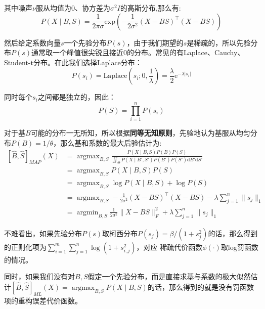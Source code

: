 其中噪声$\nu$服从均值为0、协方差为$\sigma^2I$的高斯分布,那么有:
\begin{equation}
  P(X\mid B,S)=\dfrac{1}{2\pi\sigma}\text{exp}
\left(-\frac{1}{2\sigma^2}(X-BS)^{\top}(X-BS)\right)
\end{equation}

然后给定系数向量$s$一个先验分布$P(s)$，由于我们期望的$s$是稀疏的，所以先验分布$P(s)$通常取一个峰值很尖锐且接近0的分布。常见的有Laplace、Cauchy、Student-t分布。在此我们选择Laplace分布：
\begin{equation}
P(s_i)=\text{Laplace}(s_i;0,\frac{1}{\lambda})=\frac{\lambda}{2}
\text{e}^{-\lambda|s_i|}
\end{equation}

同时每个$s_i$之间都是独立的，因此：
\begin{equation}
  P(S)=\prod_{i=1}^{n}P(s_i)
\end{equation}


对于基$B$可能的分布一无所知，所以根据\textbf{同等无知原则}，先验地认为基服从均匀分布$P(B)=1/\theta$，那么基和系数的最大后验估计为:
\begin{align*}\label{bayes}
  [\hat{B},\hat{S}]_{MAP}(X)
& =\mathop{\arg\max}_{B,S}\frac{P( X\mid B,S)P(B)P(S)}{\iint_{\Theta}P( X\mid B',S')P(B')P(S')\textrm{d}B'\textrm{d}S'}\\
& =\mathop{\arg\max}_{B,S}P(X\mid B,S)P(S)\\
& =\mathop{\arg\max}_{B,S}\log P(X\mid B,S)+\log P(S)\\
& =\mathop{\arg\max}_{B,S}
-\frac{1}{2\sigma^2}(X-BS)^{\top}(X-BS)
-\lambda\sum_{j=1}^{n}\|s_j\|_1\\
& =\mathop{\arg\min}_{B,S}\frac{1}{2\sigma^2}\|X-BS\|_F^2+
\lambda\sum_{j=1}^{n}\|s_j\|_1
\end{align*}

不难看出，如果先验分布$P(s)$取柯西分布$P(s_j) = \beta/(1+s_j^2) $的话，那么得到的正则化项为$ \sum_{i=1}^{m}\sum_{j=1}^{n}\log(1+s_{i,j}^2)$，对应
稀疏代价函数$\phi(\cdot)$取log罚函数的情况。

同时，如果我们没有对$B,S$假定一个先验分布，而是直接求基与系数的极大似然估计$[\hat{B},\hat{S}]_{ML}(X)=\mathop{\arg\max}_{B,S} P(X\mid B,S )$的话，那么得到的就是没有罚函数项的重构误差代价函数。


